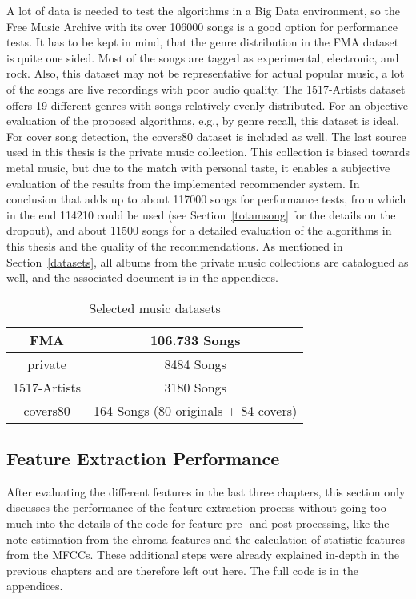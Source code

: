 A lot of data is needed to test the algorithms in a Big Data environment, so the Free Music Archive with its over 106000 songs is a good option for performance tests. It has to be kept in mind, that the genre distribution in the FMA dataset is quite one sided. Most of the songs are tagged as experimental, electronic, and rock. Also, this dataset may not be representative for actual popular music, a lot of the songs are live recordings with poor audio quality. %
The 1517-Artists dataset offers 19 different genres with songs relatively evenly distributed. For an objective evaluation of the proposed algorithms, e.g., by genre recall, this dataset is ideal. For cover song detection, the covers80 dataset is included as well.
The last source used in this thesis is the private music collection. This collection is biased towards metal music, but due to the match with personal taste, it enables a subjective evaluation of the results from the implemented recommender system.
In conclusion that adds up to about 117000 songs for performance tests, from which in the end 114210 could be used (see Section~\ref{totamsong} for the details on the dropout), and about 11500 songs for a detailed evaluation of the algorithms in this thesis and the quality of the recommendations. As mentioned in Section~\ref{datasets}, all albums from the private music collections are catalogued as well, and the associated document is in the appendices. 

\begin{table}[h]
	\begin{center}
		\begin{tabular}{|c||c|}
			\hline
			FMA & 106.733 Songs\\
			\hline
			private & 8484 Songs\\
			\hline
			1517-Artists & 3180 Songs\\
			\hline
			covers80 & 164 Songs (80 originals + 84 covers)\\
			\hline
		\end{tabular}
	\end{center}
	\caption{Selected music datasets}
	\label{used_dsets}
\end{table}
\FloatBarrier

\subsection{Feature Extraction Performance}

After evaluating the different features in the last three chapters, this section only discusses the performance of the feature extraction process without going too much into the details of the code for feature pre- and post-processing, like the note estimation from the chroma features and the calculation of statistic features from the MFCCs. These additional steps were already explained in-depth in the previous chapters and are therefore left out here. The full code is in the appendices. 

